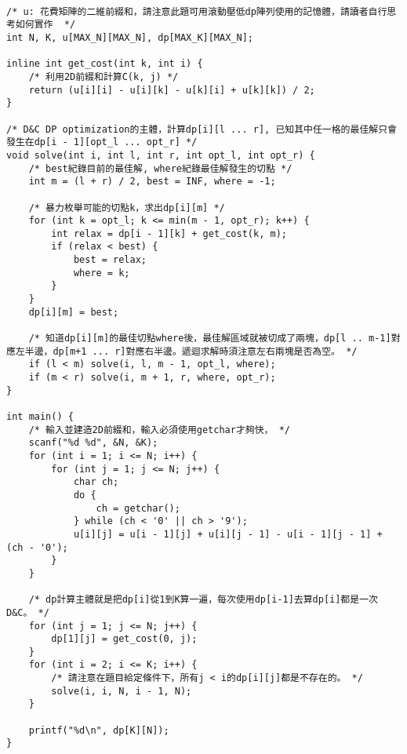 \begin{lstlisting}[caption=Ciel and Gondolas的程式碼，這題時限卡很緊，必須使用getchar。]

/* u: 花費矩陣的二維前綴和，請注意此題可用滾動壓低dp陣列使用的記憶體，請讀者自行思考如何實作  */
int N, K, u[MAX_N][MAX_N], dp[MAX_K][MAX_N];

inline int get_cost(int k, int i) {
	/* 利用2D前綴和計算C(k, j) */
	return (u[i][i] - u[i][k] - u[k][i] + u[k][k]) / 2;
}

/* D&C DP optimization的主體，計算dp[i][l ... r], 已知其中任一格的最佳解只會發生在dp[i - 1][opt_l ... opt_r] */
void solve(int i, int l, int r, int opt_l, int opt_r) {
	/* best紀錄目前的最佳解, where紀錄最佳解發生的切點 */
	int m = (l + r) / 2, best = INF, where = -1;

	/* 暴力枚舉可能的切點k，求出dp[i][m] */
	for (int k = opt_l; k <= min(m - 1, opt_r); k++) {
		int relax = dp[i - 1][k] + get_cost(k, m);
		if (relax < best) {
			best = relax;
			where = k;
		}
	}
	dp[i][m] = best;

	/* 知道dp[i][m]的最佳切點where後，最佳解區域就被切成了兩塊，dp[l .. m-1]對應左半邊，dp[m+1 ... r]對應右半邊。遞迴求解時須注意左右兩塊是否為空。 */
	if (l < m) solve(i, l, m - 1, opt_l, where);
	if (m < r) solve(i, m + 1, r, where, opt_r);
}

int main() {
	/* 輸入並建造2D前綴和，輸入必須使用getchar才夠快， */
	scanf("%d %d", &N, &K);
	for (int i = 1; i <= N; i++) {
		for (int j = 1; j <= N; j++) {
			char ch;
			do {
				ch = getchar();
			} while (ch < '0' || ch > '9');
			u[i][j] = u[i - 1][j] + u[i][j - 1] - u[i - 1][j - 1] + (ch - '0');
		}
	}

	/* dp計算主體就是把dp[i]從1到K算一遍，每次使用dp[i-1]去算dp[i]都是一次D&C。 */
	for (int j = 1; j <= N; j++) {
		dp[1][j] = get_cost(0, j);
	}
	for (int i = 2; i <= K; i++) {
		/* 請注意在題目給定條件下，所有j < i的dp[i][j]都是不存在的。 */
		solve(i, i, N, i - 1, N);
	}

	printf("%d\n", dp[K][N]);
}
\end{lstlisting}

